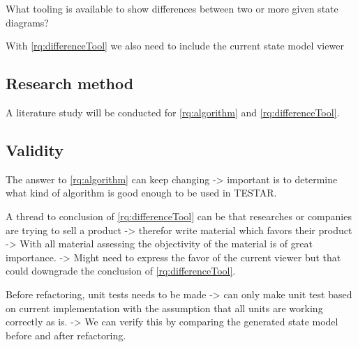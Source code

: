         
        \begin{questions}[resume]
            \item What tooling is available to show differences between two or more given state diagrams? \label{rq:differenceTool}
        \end{questions}
        
        With \ref{rq:differenceTool} we also need to include the current state model viewer \cite{thesisMulders}
        
        
        
        
    

    \subsection{Research method}
    
        A literature study will be conducted for \ref{rq:algorithm} and \ref{rq:differenceTool}. 
        
        
    \subsection{Validity}
    
        The answer to \ref{rq:algorithm} can keep changing -> important is to determine what kind of algorithm is good enough to be used in TESTAR.
        
        A thread to conclusion of \ref{rq:differenceTool} can be that researches or companies are trying to sell a product -> therefor write material which favors their product -> With all material assessing the objectivity of the material is of great importance. -> Might need to express the favor of the current viewer \cite{thesisMulders} but that could downgrade the conclusion of \ref{rq:differenceTool}. 
        
        Before refactoring, unit tests needs to be made -> can only  make unit test based on current implementation with the assumption that all units are working correctly as is. -> We can verify this by comparing the generated state model before and after refactoring.